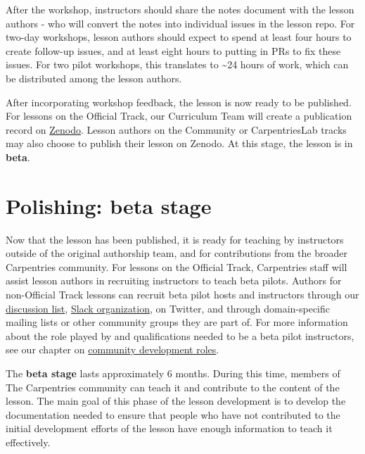 \documentclass[
]{book}
\begin{document}
After the workshop, instructors should share the notes document with the lesson authors - who
will convert the notes into individual issues in the lesson repo. For two-day workshops, lesson authors should expect
to spend at least four hours to create follow-up issues, and at least
eight hours to putting in PRs to fix these issues. For two pilot workshops, this translates
to \textasciitilde24 hours of work, which can be distributed among the lesson authors.

After incorporating workshop feedback, the lesson is
now ready to be published. For lessons on the Official
Track, our Curriculum Team will create a publication
record on \href{https://zenodo.org/communities/carpentries/?page=1\&size=20}{Zenodo}. Lesson authors on the Community or CarpentriesLab tracks
may also choose to publish their lesson on Zenodo. At this stage, the lesson is in \textbf{beta}.

\hypertarget{polishing-beta-stage}{%
\section{Polishing: beta stage}\label{polishing-beta-stage}}

Now that the lesson has been published, it is ready
for teaching by instructors outside of the original
authorship team, and for contributions from the broader
Carpentries community. For lessons on the Official Track,
Carpentries staff will assist lesson authors in recruiting instructors
to teach beta pilots. Authors for non-Official Track lessons
can recruit beta pilot hosts and instructors through our
\href{https://carpentries.topicbox.com/groups/discuss}{discussion list}, \href{https://swc-slack-invite.herokuapp.com/}{Slack organization},
on Twitter, and through domain-specific mailing lists
or other community groups they are part of.
For more information about the role played by
and qualifications needed to be a beta pilot instructors, see
our chapter on \href{https://cdh.carpentries.org/community-development-roles.html\#beta-pilot-instructors}{community development roles}.

The \textbf{beta stage} lasts approximately 6 months. During this time, members of
The Carpentries community can teach it and contribute to the content of the lesson.
The main goal of this phase of the lesson development is to develop the documentation
needed to ensure that people who have not contributed to the initial development
efforts of the lesson have enough information to teach it effectively.
\end{document}
